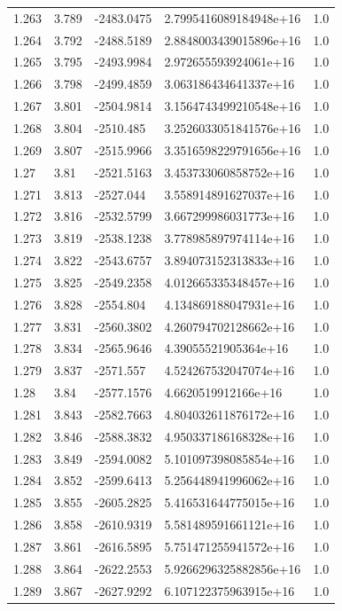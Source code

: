 \begin{tabular}{lllll}
1.263 & 3.789 & -2483.0475 & 2.7995416089184948e+16 & 1.0 \\
1.264 & 3.792 & -2488.5189 & 2.8848003439015896e+16 & 1.0 \\
1.265 & 3.795 & -2493.9984 & 2.972655593924061e+16 & 1.0 \\
1.266 & 3.798 & -2499.4859 & 3.063186434641337e+16 & 1.0 \\
1.267 & 3.801 & -2504.9814 & 3.1564743499210548e+16 & 1.0 \\
1.268 & 3.804 & -2510.485 & 3.2526033051841576e+16 & 1.0 \\
1.269 & 3.807 & -2515.9966 & 3.3516598229791656e+16 & 1.0 \\
1.27 & 3.81 & -2521.5163 & 3.453733060858752e+16 & 1.0 \\
1.271 & 3.813 & -2527.044 & 3.558914891627037e+16 & 1.0 \\
1.272 & 3.816 & -2532.5799 & 3.667299986031773e+16 & 1.0 \\
1.273 & 3.819 & -2538.1238 & 3.778985897974114e+16 & 1.0 \\
1.274 & 3.822 & -2543.6757 & 3.894073152313833e+16 & 1.0 \\
1.275 & 3.825 & -2549.2358 & 4.012665335348457e+16 & 1.0 \\
1.276 & 3.828 & -2554.804 & 4.134869188047931e+16 & 1.0 \\
1.277 & 3.831 & -2560.3802 & 4.260794702128662e+16 & 1.0 \\
1.278 & 3.834 & -2565.9646 & 4.39055521905364e+16 & 1.0 \\
1.279 & 3.837 & -2571.557 & 4.524267532047074e+16 & 1.0 \\
1.28 & 3.84 & -2577.1576 & 4.6620519912166e+16 & 1.0 \\
1.281 & 3.843 & -2582.7663 & 4.804032611876172e+16 & 1.0 \\
1.282 & 3.846 & -2588.3832 & 4.950337186168328e+16 & 1.0 \\
1.283 & 3.849 & -2594.0082 & 5.101097398085854e+16 & 1.0 \\
1.284 & 3.852 & -2599.6413 & 5.256448941996062e+16 & 1.0 \\
1.285 & 3.855 & -2605.2825 & 5.416531644775015e+16 & 1.0 \\
1.286 & 3.858 & -2610.9319 & 5.581489591661121e+16 & 1.0 \\
1.287 & 3.861 & -2616.5895 & 5.751471255941572e+16 & 1.0 \\
1.288 & 3.864 & -2622.2553 & 5.9266296325882856e+16 & 1.0 \\
1.289 & 3.867 & -2627.9292 & 6.107122375963915e+16 & 1.0 \\

\end{tabular}
